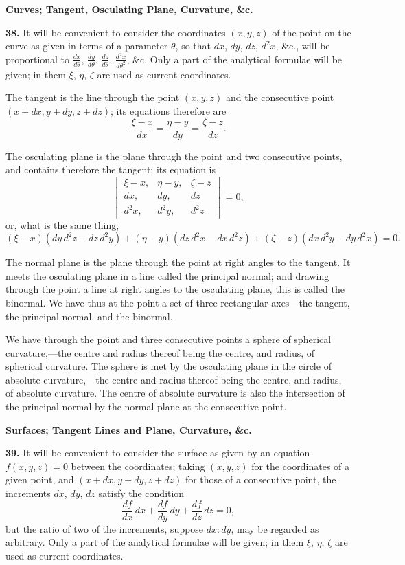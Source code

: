 \documentclass[11pt,a4paper]{book}
\begin{document}
\bigskip
\noindent\textbf{Curves; Tangent, Osculating Plane, Curvature, \&c.}

\smallskip

\textbf{38.}\quad
It will be convenient to consider the coordinates $(x, y, z)$ of the point on the curve as given in terms of a parameter $\theta$, so that $dx$, $dy$, $dz$, $d^{2}x$, \&c., will be proportional to $\frac{dx}{d\theta}$, $\frac{dy}{d\theta}$, $\frac{dz}{d\theta}$, $\frac{d^{2}x}{d\theta^{2}}$, \&c. Only a part of the analytical formulae will be given; in them $\xi$, $\eta$, $\zeta$ are used as current coordinates.

The tangent is the line through the point $(x, y, z)$ and the consecutive point $(x + dx, y + dy, z + dz)$; its equations therefore are
\[
\frac{\xi - x}{dx} = \frac{\eta - y}{dy} = \frac{\zeta - z}{dz}.
\]

The osculating plane is the plane through the point and two consecutive points, and contains therefore the tangent; its equation is
\[
\begin{vmatrix}
\xi - x, & \eta - y, & \zeta - z \\
dx, & dy, & dz \\
d^{2}x, & d^{2}y, & d^{2}z
\end{vmatrix} = 0,
\]
or, what is the same thing,
\[
(\xi - x)(dy\, d^{2}z - dz\, d^{2}y) + (\eta - y)(dz\, d^{2}x - dx\, d^{2}z) + (\zeta - z)(dx\, d^{2}y - dy\, d^{2}x) = 0.
\]

The normal plane is the plane through the point at right angles to the tangent. It meets the osculating plane in a line called the principal normal; and drawing through the point a line at right angles to the osculating plane, this is called the binormal. We have thus at the point a set of three rectangular axes---the tangent, the principal normal, and the binormal.

We have through the point and three consecutive points a sphere of spherical curvature,---the centre and radius thereof being the centre, and radius, of spherical curvature. The sphere is met by the osculating plane in the circle of absolute curvature,---the centre and radius thereof being the centre, and radius, of absolute curvature. The centre of absolute curvature is also the intersection of the principal normal by the normal plane at the consecutive point.

\bigskip
\noindent\textbf{Surfaces; Tangent Lines and Plane, Curvature, \&c.}

\smallskip

\textbf{39.}\quad
It will be convenient to consider the surface as given by an equation $f(x, y, z) = 0$ between the coordinates; taking $(x, y, z)$ for the coordinates of a given point, and $(x + dx, y + dy, z + dz)$ for those of a consecutive point, the increments $dx$, $dy$, $dz$ satisfy the condition
\[
\frac{df}{dx}\, dx + \frac{df}{dy}\, dy + \frac{df}{dz}\, dz = 0,
\]
but the ratio of two of the increments, suppose $dx : dy$, may be regarded as arbitrary. Only a part of the analytical formulae will be given; in them $\xi$, $\eta$, $\zeta$ are used as current coordinates.
\end{document}
